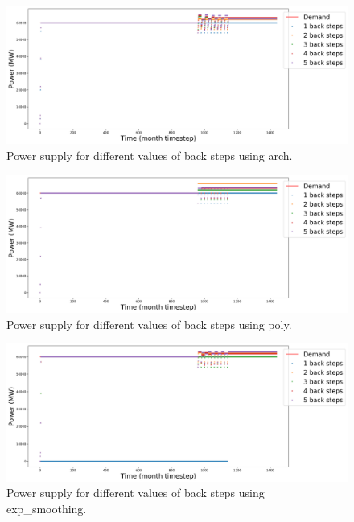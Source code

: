 \documentclass[11pt]{article}
\begin{document}
\begin{figure}[H]
	\centering
	\includegraphics[width=\textwidth]{23-figures/23-power-buffer0-arch-back.png} 
	\hfill
	\caption{Power supply for different values of back steps using arch.}
	\label{fig:23-back-arch}
\end{figure}

\begin{figure}[H]
	\centering
	\includegraphics[width=\textwidth]{23-figures/23-power-buffer0-poly-back.png} 
	\hfill
	\caption{Power supply for different values of back steps using poly.}
	\label{fig:23-back-poly}
\end{figure}

\begin{figure}[H]
	\centering
	\includegraphics[width=\textwidth]{23-figures/23-power-buffer0-exp_smoothing-back.png} 
	\hfill
	\caption{Power supply for different values of back steps using exp\_smoothing.}
	\label{fig:23-back-exp_smoothing}
\end{figure}
\end{document}
